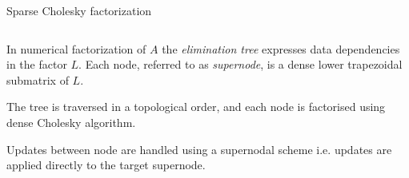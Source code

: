 \documentclass[unknownkeysallowed]{beamer}
\newcommand{\db}[1]{\textcolor{mblue}{#1\xspace}}
\begin{document}
\begin{frame}{Sparse Cholesky factorization}
  
  \begin{columns}  

    \begin{column}{0.6\textwidth}  

      In numerical factorization of \alert{$A$} the
      \db{\textit{elimination tree}} expresses data dependencies in
      the factor \alert{$L$}. Each node, referred to as
      \db{\textit{supernode}}, is a \alert{dense} lower trapezoidal
      \alert{submatrix} of \alert{$L$}.

      \vspace{0.4cm}

      The tree is traversed in a \db{topological order}, and each node is
      factorised using \alert{dense Cholesky algorithm}.

      \vspace{0.4cm}
      
      Updates between node are handled using a \alert{supernodal scheme}
      i.e. updates are applied directly to the target supernode.
    \end{column}


\end{columns}
\end{frame}
\end{document}
